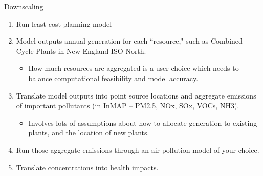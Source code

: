 \documentclass{beamer}
\begin{document}
\begin{frame}{Downscaling}
\begin{enumerate}
    \item Run least-cost planning model
    \item Model outputs annual generation for each ``resource," such as Combined Cycle Plants in New England ISO North.
    \begin{itemize}
        \item How much resources are aggregated is a user choice which needs to balance computational feasibility and model accuracy.
    \end{itemize}
    \item Translate model outputs into point source locations and aggregate emissions of important pollutants (in InMAP -- PM2.5, NOx, SOx, VOCs, NH3).
        \begin{itemize}
            \item Involves lots of assumptions about how to allocate generation to existing plants, and the location of new plants.
        \end{itemize}
    \item Run those aggregate emissions through an air pollution model of your choice.
    \item Translate concentrations into health impacts.
\end{enumerate}
\end{frame}
\end{document}
